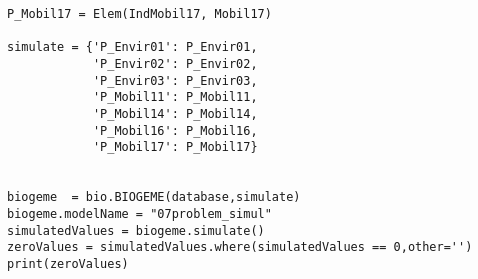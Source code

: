 \documentclass[12pt,a4paper]{article}
\begin{document}
\begin{lstlisting}[style=numbers]
P_Mobil17 = Elem(IndMobil17, Mobil17)

simulate = {'P_Envir01': P_Envir01,
            'P_Envir02': P_Envir02,
            'P_Envir03': P_Envir03,
            'P_Mobil11': P_Mobil11,
            'P_Mobil14': P_Mobil14,
            'P_Mobil16': P_Mobil16,
            'P_Mobil17': P_Mobil17}


biogeme  = bio.BIOGEME(database,simulate)
biogeme.modelName = "07problem_simul"
simulatedValues = biogeme.simulate()
zeroValues = simulatedValues.where(simulatedValues == 0,other='')
print(zeroValues)
\end{lstlisting}

\clearpage


\end{document}
